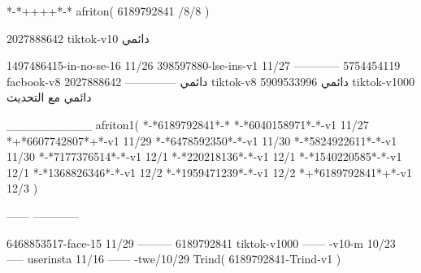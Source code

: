*-*++++*-*
afriton(
6189792841 /8/8
)

2027888642 tiktok-v10
دائمي

1497486415-in-no-se-16 11/26
398597880-lse-ins-v1 11/27
------------
5754454119 facbook-v8
دائمي
--------------
2027888642 tiktok-v8
دائمي
5909533996 tiktok-v1000
دائمي مع التحديث

__________
afriton1(
*-*6189792841*-*
*-*6040158971*-*-v1 11/27
*+*6607742807*+*-v1 11/29
*-*6478592350*-*-v1 11/30
*-*5824922611*-*-v1 11/30
*-*7177376514*-*-v1 12/1
*-*220218136*-*-v1 12/1
*-*1540220585*-*-v1 12/1
*-*1368826346*-*-v1 12/2
*-*1959471239*-*-v1 12/2
*+*6189792841*+*-v1 12/3
)

------
------------

6468853517-face-15 11/29
---------
6189792841 tiktok-v1000
------
-v10-m 10/23
-----
userinsta 11/16
------
-twe/10/29
Trind(
6189792841-Trind-v1 
)
